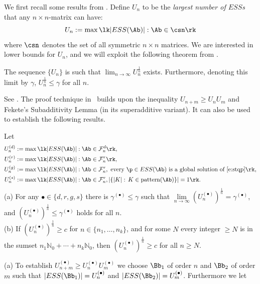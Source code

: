 \documentclass[moor]{informs3}              %
\begin{document}
We first recall some results from \cite{Broo93a}.
Define $U_n$ to be the \emph{largest number of $ESS$s} that any $n \times n$-matrix can have:
$$U_n := \max \lk |ESS(\Ab)| : \Ab\in \csn\rk$$
where $\csn$ denotes the set of all symmetric $n\times n$ matrices.
We are interested in lower bounds for $U_n$, and we will exploit the following theorem from \cite{Broo93a}.
\begin{thm}
\label{Broom_theorem}
The sequence $\{U_n\}$ is such that $\lim_{n \rightarrow \infty} U^{\frac 1 n}_n$ exists. Furthermore, denoting this limit by $\gamma$, $U^{\frac 1 n}_n \leq \gamma$ for all $n$.
\end{thm}
\bep
See \cite[Thm.~2]{Broo93a}.
\ep
The proof technique in~\cite{Broo93a} builds upon the inequality $U_{n+m}\ge U_nU_m$ and Fekete's Subadditivity Lemma (in its superadditive variant). It can also be used to establish the following results.
\begin{thm}
\label{exp_growth}
Let
\begin{align*}
U_n^{(d)} &:= \max \lk |ESS(\Ab)| : \Ab\in \mathcal{F}_n^d\rk,\\
 U_n^{(r)} &:= \max \lk |ESS(\Ab)| : \Ab\in \mathcal{F}_n^r\rk,\\
 U_n^{(g)} &:= \max \lk |ESS(\Ab)| : \Ab\in \mathcal{F}_n^r, \textup{ every }\p\in ESS(\Ab)\textup{ is a global solution of }\eqref{e:stqp}\rk,\\
 U_n^{(s)} &:= \max \lk |ESS(\Ab)| : \Ab\in \mathcal{F}_n^r, |\{|K|:\,K\in\textup{pattern}(\Ab)\}|=1\rk.
\end{align*}
(a) For any $\bullet\in\{d,r,g,s\}$ there is $\gamma^{(\bullet)}\le\gamma$ such that $\lim\limits_{n \rightarrow \infty} (U_n^{(\bullet)})^{\frac 1 n}=\gamma^{(\bullet)}$, and $(U_n^{(\bullet)})^{\frac 1 n}\le\gamma^{(\bullet)}$ holds for all $n$.\\
(b) If $(U_n^{(\bullet)})^{\frac 1 n}\ge c$ for $n\in\{n_1,\ldots,n_k\}$, and for some $N$ every integer $\ge N$ is in the sumset $n_1\mathbb{N}_0+\cdots+n_k\mathbb{N}_0$, then $(U_n^{(\bullet)})^{\frac 1 n}\ge c$ for all $n\ge N$.
\end{thm}
\bep (a) To establish $U_{n+m}^{(\bullet)}\ge U_n^{(\bullet)}U_m^{(\bullet)}$ we choose $\Bb_1$ of order $n$ and $\Bb_2$ of order $m$ such that $|ESS(\Bb_1)|=U_n^{(\bullet)}$ and $|ESS(\Bb_2)|=U_m^{(\bullet)}$. Furthermore we let
\end{document}
